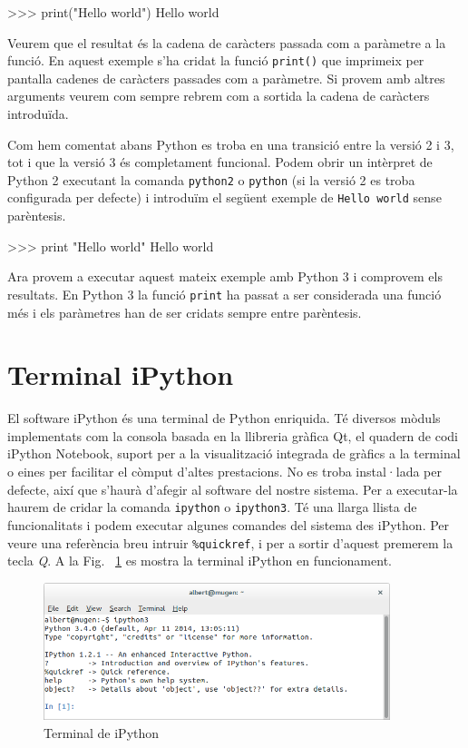 \begin{tip}[caption=Hello world]
>>> print("Hello world")
Hello world
\end{tip}




Veurem que el resultat és la cadena de caràcters passada com a paràmetre a la funció. En aquest exemple s'ha cridat la funció {\tt print()} que imprimeix per pantalla cadenes de caràcters passades com a paràmetre. Si provem amb altres arguments veurem com sempre rebrem com a sortida la cadena de caràcters introduïda. 


Com hem comentat abans Python es troba en una transició entre la versió 2 i 3, tot i que la versió 3 és completament funcional. Podem obrir un intèrpret de Python 2 executant la comanda {\tt python2} o {\tt python} (si la versió 2 es troba configurada per defecte) i introduïm el següent exemple de {\tt Hello world} sense parèntesis. 


\begin{blockcode}
>>> print "Hello world"
Hello world
\end{blockcode}

Ara provem a executar aquest mateix exemple amb Python 3 i comprovem els resultats. En Python 3 la funció {\tt print} ha passat a ser considerada una funció més i els paràmetres han de ser cridats sempre entre parèntesis.


\section{Terminal iPython}


El software iPython és una terminal de Python enriquida. Té diversos mòduls implementats com la consola basada en la llibreria gràfica Qt, el quadern de codi iPython Notebook, suport per a la visualització integrada de gràfics a la terminal o eines per facilitar el còmput d'altes prestacions. No es troba instal·lada per defecte, així que s'haurà d'afegir al software del nostre sistema. Per a executar-la haurem de cridar la comanda {\tt ipython} o {\tt ipython3}. Té una llarga llista de funcionalitats i podem executar algunes comandes del sistema des iPython. Per veure una referència breu intruir {\tt \%quickref}, i per a sortir d'aquest premerem la tecla \emph{Q}. A la Fig. ~\ref{fig:ipython-term} es mostra la terminal iPython en funcionament.

\begin{figure}[!h]
    \begin{centering}
    \includegraphics[width=0.9\textwidth]{img/ipython-term.png}
    \caption{Terminal de iPython}
    \label{fig:ipython-term}
    \end{centering}
\end{figure}


